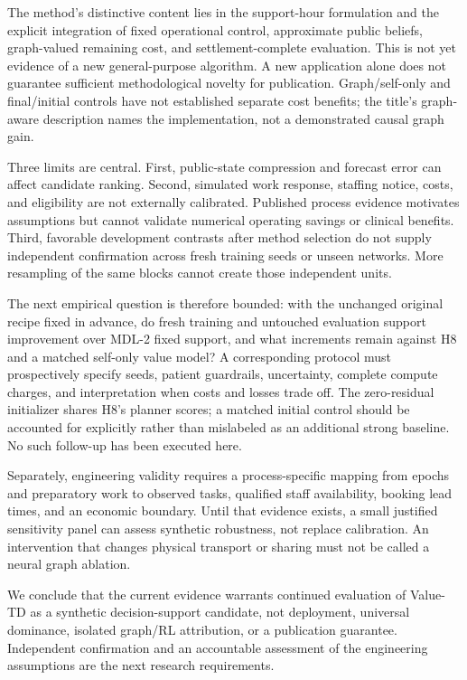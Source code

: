 \documentclass[preprint,review,12pt]{elsarticle}
\begin{document}
The method's distinctive content lies in the support-hour formulation and
the explicit integration of fixed operational control, approximate public
beliefs, graph-valued remaining cost, and settlement-complete evaluation.
This is not yet evidence of a new general-purpose algorithm. A new
application alone does not guarantee sufficient methodological novelty for
publication. Graph/self-only and final/initial controls have not established
separate cost benefits; the title's graph-aware description names the
implementation, not a demonstrated causal graph gain.

Three limits are central. First, public-state compression and forecast error
can affect candidate ranking. Second, simulated work response, staffing
notice, costs, and eligibility are not externally calibrated. Published
process evidence motivates assumptions but cannot validate numerical
operating savings or clinical benefits. Third, favorable development
contrasts after method selection do not supply independent confirmation
across fresh training seeds or unseen networks. More resampling of the same
blocks cannot create those independent units.

The next empirical question is therefore bounded: with the unchanged
original recipe fixed in advance, do fresh training and untouched evaluation
support improvement over MDL-2 fixed support, and what increments remain
against H8 and a matched self-only value model? A corresponding protocol
must prospectively specify seeds, patient guardrails, uncertainty, complete
compute charges, and interpretation when costs and losses trade off.
The zero-residual initializer shares H8's planner scores; a matched initial
control should be accounted for explicitly rather than mislabeled as an
additional strong baseline. No such follow-up has been executed here.

Separately, engineering validity requires a process-specific mapping from
epochs and preparatory work to observed tasks, qualified staff availability,
booking lead times, and an economic boundary. Until that evidence exists,
a small justified sensitivity panel can assess synthetic robustness, not
replace calibration. An intervention that changes physical transport or
sharing must not be called a neural graph ablation.

We conclude that the current evidence warrants continued evaluation of
Value-TD as a synthetic decision-support candidate, not deployment,
universal dominance, isolated graph/RL attribution, or a publication
guarantee. Independent confirmation and an accountable assessment of the
engineering assumptions are the next research requirements.
\end{document}
